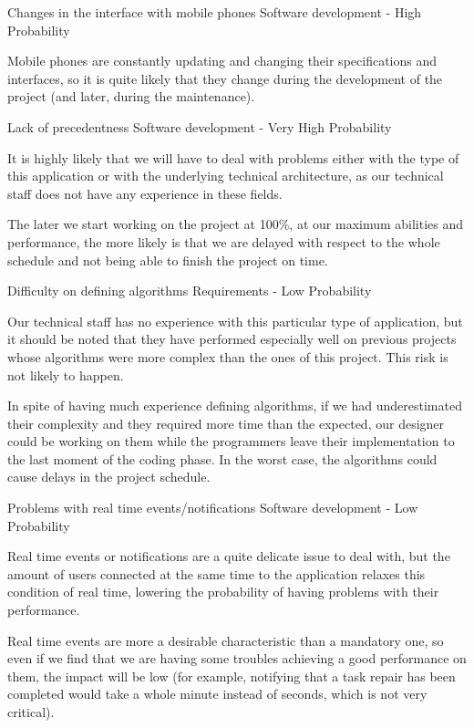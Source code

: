 \begin{risk}{Changes in the interface with mobile phones}
\riskcat Software development
 - High Probability 

Mobile phones are constantly updating and changing their specifications and interfaces, so it is quite likely that they change during the development of the project (and later, during the maintenance).
\end{risk}

\begin{risk}{Lack of precedentness}
\riskcat Software development
 - Very High Probability 

It is highly likely that we will have to deal with problems either with the type of this application or with the underlying technical architecture, as our technical staff does not have any experience in these fields.

The later we start working on the project at 100\%, at our maximum abilities and performance, the more likely is that we are delayed with respect to the whole schedule and not being able to finish the project on time.
\end{risk}

\begin{risk}{Difficulty on defining algorithms}
\riskcat Requirements
 - Low Probability 

Our technical staff has no experience with this particular type of application, but it should be noted that they have performed especially well on previous projects whose algorithms were more complex than the ones of this project. This risk is not likely to happen.

In spite of having much experience defining algorithms, if we had underestimated their complexity and they required more time than the expected, our designer could be working on them while the programmers leave their implementation to the last moment of the coding phase. In the worst case, the algorithms could cause delays in the project schedule.
\end{risk}

\begin{risk}{Problems with real time events/notifications}
\riskcat Software development
 - Low Probability 

Real time events or notifications are a quite delicate issue to deal with, but the amount of users connected at the same time to the application relaxes this condition of real time, lowering the probability of having problems with their performance.

Real time events are more a desirable characteristic than a mandatory one, so even if we find that we are having some troubles achieving a good performance on them, the impact will be low (for example, notifying that a task repair has been completed would take a whole minute instead of seconds, which is not very critical).
\end{risk}

